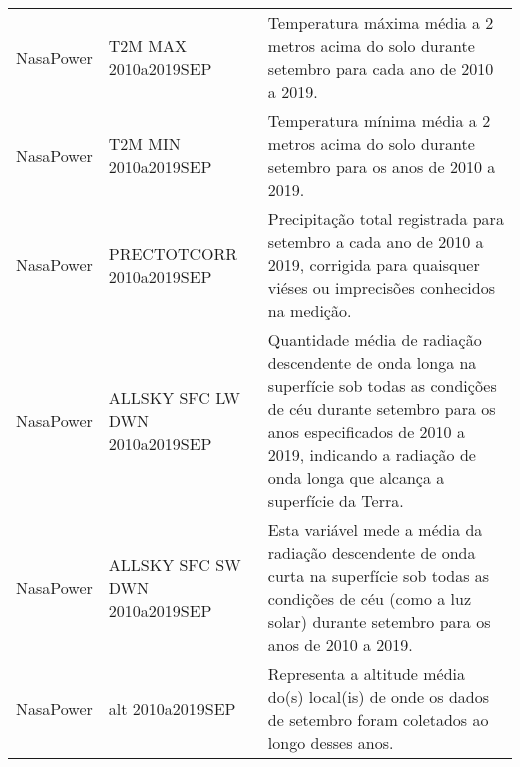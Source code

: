 \begin{longtable}{@{} p{4cm} p{4cm} p{8cm} @{}}
	NasaPower &
	T2M MAX 2010a2019SEP &
	Temperatura máxima média a 2 metros acima do solo durante setembro para cada ano de 2010 a 2019. \\
	NasaPower &
	T2M MIN 2010a2019SEP &
	Temperatura mínima média a 2 metros acima do solo durante setembro para os anos de 2010 a 2019. \\
	NasaPower &
	PRECTOTCORR 2010a2019SEP &
	Precipitação total registrada para setembro a cada ano de 2010 a 2019, corrigida para quaisquer viéses ou imprecisões conhecidos na medição. \\
	NasaPower &
	ALLSKY SFC LW DWN 2010a2019SEP &
	Quantidade média de radiação descendente de onda longa na superfície sob todas as condições de céu durante setembro para os anos especificados de 2010 a 2019, indicando a radiação de onda longa que alcança a superfície da Terra. \\
	NasaPower &
	ALLSKY SFC SW DWN 2010a2019SEP &
	Esta variável mede a média da radiação descendente de onda curta na superfície sob todas as condições de céu (como a luz solar) durante setembro para os anos de 2010 a 2019. \\
	NasaPower &
	alt 2010a2019SEP &
	Representa a altitude média do(s) local(is) de onde os dados de setembro foram coletados ao longo desses anos. \\* \bottomrule
	\end{longtable}
	